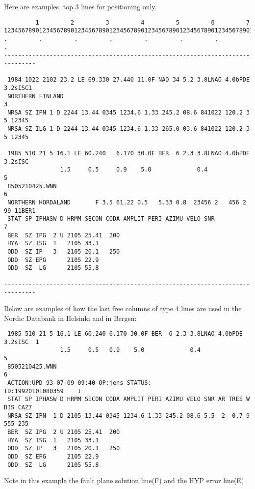  Here are examples, top 3 lines for positioning only. 
\begin{verbatim}
         1         2         3         4         5         6         7 
1234567890123456789012345678901234567890123456789012345678901234567890123456789
.         .         .         .         .         .         .         .
-------------------------------------------------------------------------------

 1984 1022 2102 23.2 LE 69.330 27.440 11.0F NAO 34 5.2 3.8LNAO 4.0bPDE 3.2sISC1
 NORTHERN FINLAND                                                             3
 NRSA SZ IPN 1 D 2244 13.44 0345 1234.6 1.33 245.2 08.6 841022 120.2 3 5 12345 
 NRSA SZ ILG 1 D 2244 13.44 0345 1234.6 1.33 265.0 03.6 841022 120.2 3 5 12345 

 1985 510 21 5 16.1 LE 60.240   6.170 30.0F BER  6 2.3 3.8LNAO 4.0bPDE 3.2sISC 
                1.5     0.5     0.9    5.0             0.4                    5 
 8505210425.WNN                                                               6
 NORTHERN HORDALAND       F 3.5 61.22 0.5   5.33 0.8  23456 2   456 2 99 11BER1
 STAT SP IPHASW D HRMM SECON CODA AMPLIT PERI AZIMU VELO SNR                  7
 BER  SZ IPG  2 U 2105 25.41  200
 HYA  SZ ISG  1   2105 33.1
 ODD  SZ IP   3   2105 20.1   250
 ODD  SZ EPG      2105 22.9
 ODD  SZ  LG      2105 55.8 

-------------------------------------------------------------------------------
\end{verbatim}
Below are examples of how the last free columns of type 4 lines are used in the Nordic Databank in Helsinki and in Bergen: 
\begin{verbatim}
 1985 510 21 5 16.1 LE 60.240 6.170 30.0F BER  6 2.3 3.8LNAO 4.0bPDE 3.2sISC  1 
                1.5     0.5   0.9    5.0             0.4                      5
 8505210425.WNN                                                               6
 ACTION:UPD 93-07-09 09:40 OP:jens STATUS:               ID:19920101080359    I
 STAT SP IPHASW D HRMM SECON CODA AMPLIT PERI AZIMU VELO SNR AR TRES W DIS CAZ7
 NRSA SZ IPN  1 D 2105 13.44 0345 1234.6 1.33 245.2 08.6 5.5  2 -0.7 9 555 235
 BER  SZ IPG  2 U 2105 25.41  200
 HYA  SZ ISG  1   2105 33.1
 ODD  SZ IP   3   2105 20.1   250
 ODD  SZ EPG      2105 22.9
 ODD  SZ  LG      2105 55.8 
\end{verbatim}
Note in this example the fault plane solution line(F) and the HYP error line(E) 
